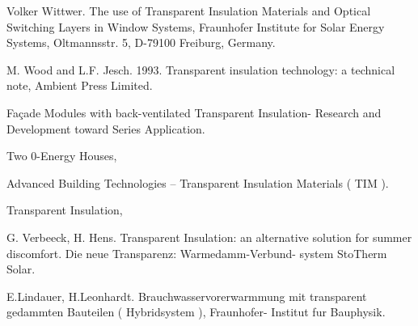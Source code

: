 Volker Wittwer. The use of Transparent Insulation Materials and Optical Switching Layers in Window Systems, Fraunhofer Institute for Solar Energy Systems, Oltmannsstr. 5, D-79100 Freiburg, Germany.

M. Wood and L.F. Jesch. 1993. Transparent insulation technology: a technical note, Ambient Press Limited.

Façade Modules with back-ventilated Transparent Insulation- Research and Development toward Series Application.

Two 0-Energy Houses,

Advanced Building Technologies -- Transparent Insulation Materials ( TIM ).

Transparent Insulation,

G. Verbeeck, H. Hens. Transparent Insulation: an alternative solution for summer discomfort. Die neue Transparenz: Warmedamm-Verbund- system StoTherm Solar.

E.Lindauer, H.Leonhardt. Brauchwasservorerwarmmung mit transparent gedammten Bauteilen ( Hybridsystem ), Fraunhofer- Institut fur Bauphysik.
